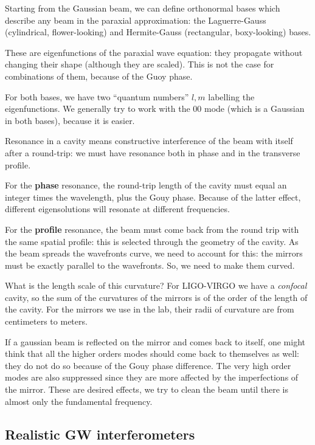 \documentclass[main.tex]{subfiles}
\begin{document}
Starting from the Gaussian beam, we can define orthonormal bases which describe any beam in the paraxial approximation: the Laguerre-Gauss (cylindrical, flower-looking) and Hermite-Gauss (rectangular, boxy-looking) bases.

These are eigenfunctions of the paraxial wave equation: they propagate without changing their shape (although they are scaled).
This is not the case for combinations of them, because of the Guoy phase.

For both bases, we have two ``quantum numbers'' \(l, m\) labelling the eigenfunctions.
We generally try to work with the 00 mode (which is a Gaussian in both bases), because it is easier. 

Resonance in a cavity means constructive interference of the beam with itself after a round-trip: we must have resonance both in phase and in the transverse profile. 

For the \textbf{phase} resonance, the round-trip length of the cavity must equal an integer times the wavelength, plus the Gouy phase. 
Because of the latter effect, different eigensolutions will resonate at different frequencies. 

For the \textbf{profile} resonance, the beam must come back from the round trip with the same spatial profile: this is selected through the geometry of the cavity. 
As the beam spreads the wavefronts curve, we need to account for this: the mirrors must be exactly parallel to the wavefronts. 
So, we need to make them curved. 

What is the length scale of this curvature?
For LIGO-VIRGO we have a \emph{confocal} cavity, so the sum of the curvatures of the mirrors is of the order of the length of the cavity. 
For the mirrors we use in the lab, their radii of curvature are from centimeters to meters. 

If a gaussian beam is reflected on the mirror and comes back to itself, one might think that all the higher orders modes should come back to themselves as well: they do not do so because of the Gouy phase difference.
The very high order modes are also suppressed since they are more affected by the imperfections of the mirror.
These are desired effects, we try to clean the beam until there is almost only the fundamental frequency.

\subsection{Realistic GW interferometers}
\end{document}
